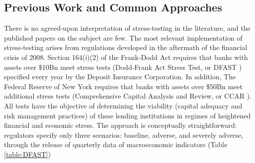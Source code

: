 \documentclass[letter, 12pt]{article}
\begin{document}
\subsection{Previous Work and Common Approaches}
%
There is no agreed-upon interpretation of stress-testing in the literature, and the published papers on the subject are few. The most relevant implementation of stress-testing arises from regulations developed in the aftermath of the financial crisis of 2008. Section 164(i)(2) of the Frank-Dodd Act requires that banks with assets over \$10Bn meet stress tests (Dodd-Frank Act Stress Test, or DFAST \cite{fed2013}) specified every year by the Deposit Insurance Corporation. In addition, The Federal Reserve of New York requires that banks with assets over \$50Bn meet additional stress tests (Comprehensive Capital Analysis and Review, or CCAR \cite{fed2017, fed2018}). All tests have the objective of determining the viability (capital adequacy and risk management practices) of these lending institutions in regimes of heightened financial and economic stress. The approach is conceptually straightforward: regulators specify only three scenarios: baseline, adverse, and severely adverse, through the release of quarterly data of macroeconomic indicators (Table \ref{table:DFAST})
\end{document}
